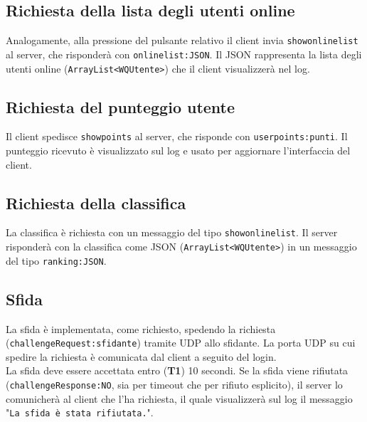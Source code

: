 \documentclass[10pt]{article}
\begin{document}
{\subsection{Richiesta della lista degli utenti online}
Analogamente, alla pressione del pulsante relativo il client invia \texttt{showonlinelist} al server, che risponderà con \texttt{onlinelist:JSON}. Il JSON rappresenta la lista degli utenti online (\texttt{ArrayList<WQUtente>}) che il client visualizzerà nel log.

\subsection{Richiesta del punteggio utente}
Il client spedisce \texttt{showpoints} al server, che risponde con \texttt{userpoints:punti}. Il punteggio ricevuto è visualizzato sul log e usato per aggiornare l'interfaccia del client.

\subsection{Richiesta della classifica}
La classifica è richiesta con un messaggio del tipo \texttt{showonlinelist}. Il server risponderà con la classifica come JSON (\texttt{ArrayList<WQUtente>}) in un messaggio del tipo \texttt{ranking:JSON}.

\subsection{Sfida}
La sfida è implementata, come richiesto, spedendo la richiesta (\texttt{challengeRequest:sfidante}) tramite UDP allo sfidante. La porta UDP su cui spedire la richiesta è comunicata dal client a seguito del login.\\
La sfida deve essere accettata entro (\textbf{T1}) 10 secondi. Se la sfida viene rifiutata (\texttt{challengeResponse:NO}, sia per timeout che per rifiuto esplicito), il server lo comunicherà al client che l'ha richiesta, il quale visualizzerà sul log il messaggio "\texttt{La sfida è stata rifiutata.}".
}
\end{document}
